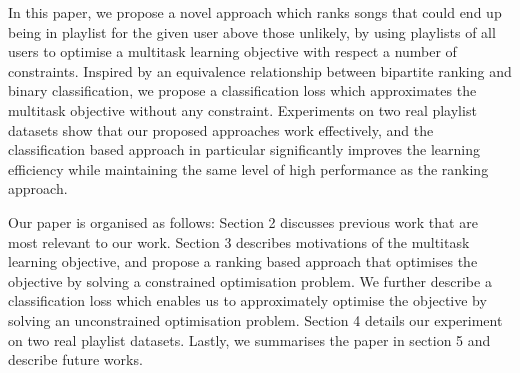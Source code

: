 In this paper, we propose a novel approach which ranks songs that could end up being in playlist for the 
given user above those unlikely, by using playlists of all users to optimise a multitask learning 
objective with respect a number of constraints.
Inspired by an equivalence relationship between bipartite ranking and binary classification,
we propose a classification loss which approximates the multitask objective without any constraint.
Experiments on two real playlist datasets show that our proposed approaches work effectively,
and the classification based approach in particular significantly improves the learning efficiency 
while maintaining the same level of high performance as the ranking approach.

Our paper is organised as follows:
Section 2 discusses previous work that are most relevant to our work.
Section 3 describes motivations of the multitask learning objective, and propose a ranking based approach 
that optimises the objective by solving a constrained optimisation problem.
We further describe a classification loss which enables us to approximately optimise the objective by
solving an unconstrained optimisation problem.
Section 4 details our experiment on two real playlist datasets.
Lastly, we summarises the paper in section 5 and describe future works.
